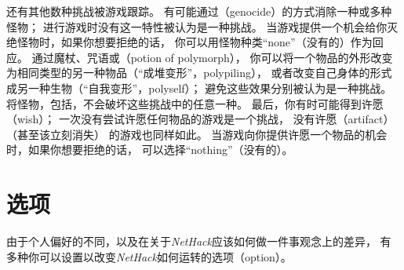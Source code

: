 \documentclass[a4paper, 10pt]{article}
\begin{document}
还有其他数种挑战被游戏跟踪。
有可能通过\zhTransGenocide（genocide）的方式消除一种或多种怪物；
进行游戏时没有这一特性被认为是一种挑战。
当游戏提供一个机会给你灭绝怪物时，如果你想要拒绝的话，
你可以用怪物种类“none”（没有的）作为回应。
通过魔杖、咒语或\zhTransPotionOfPolymorph（potion of polymorph），
你可以将一个物品的外形改变为相同类型的另一种物品（“成堆变形”，polypiling），
或者改变自己身体的形式成另一种生物（“自我变形”，polyself）；
避免这些效果分别被认为是一种挑战。
将怪物\zhTransPolymorph，包括\zhTransPets，不会破坏这些挑战中的任意一种。
最后，你有时可能得到许愿（wish）；
一次没有尝试许愿任何物品的游戏是一个挑战，
没有许愿\zhTransArtifact（artifact）（甚至该\zhTransArtifact{}立刻消失）
的游戏也同样如此。
当游戏向你提供许愿一个物品的机会时，如果你想要拒绝的话，
可以选择“nothing”（没有的）。

\section{选项}

由于个人偏好的不同，以及在关于{\it NetHack\/}应该如何做一件事观念上的差异，
有多种你可以设置以改变{\it NetHack\/}如何运转的选项（option）。

\end{document}
